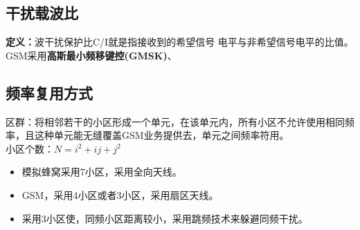 \subsection{干扰载波比}
\textbf{定义：}波干扰保护比C/I就是指接收到的希望信号
电平与非希望信号电平的比值。\\
GSM采用\textbf{高斯最小频移键控(GMSK)}、
\subsection{频率复用方式}
区群：将相邻若干的小区形成一个单元，在该单元内，所有小区不允许使用相同频率，且这种单元能无缝覆盖GSM业务提供去，单元之间频率符用。\\
小区个数：$ N= i^2 + ij+j^2 $
\begin{itemize}
	\item 模拟蜂窝采用7小区，采用全向天线。
	\item GSM，采用4小区或者3小区，采用扇区天线。
	\item 采用3小区使，同频小区距离较小，采用跳频技术来躲避同频干扰。
\end{itemize}
